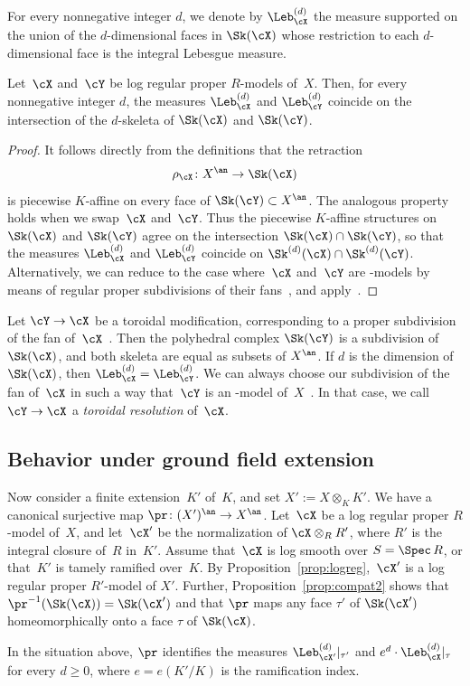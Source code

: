 For every nonnegative integer $d$, we denote by $\Leb^{(d)}_{\cX}$ the measure supported on the union of the $d$-dimensional faces in $\Sk(\cX)$ whose restriction
to each $d$-dimensional face is the integral Lebesgue measure.

\begin{prop}\label{prop:compat3}
Let~$\cX$ and~$\cY$ be log regular proper $R$\nobreakdash-models of~$X$.
Then, for every nonnegative integer $d$, the measures $\Leb^{(d)}_{\cX}$ and $\Leb^{(d)}_{\cY}$ coincide on the intersection of the $d$\nobreakdash-skeleta of $\Sk(\cX)$ and $\Sk(\cY)$.
\end{prop}

\begin{proof}
It follows directly from the definitions that the retraction
\[
\rho_{\cX}\colon X^{\an}\to \Sk(\cX)
\]
is piecewise $K$\nobreakdash-affine
on every face of $\Sk(\cY)\subset X^{\an}$. The analogous property holds when we swap~$\cX$ and~$\cY$. Thus the piecewise $K$\nobreakdash-affine structures on $\Sk(\cX)$ and $\Sk(\cY)$ agree on the intersection $\Sk(\cX)\cap \Sk(\cY)$, so that the measures $\Leb_{\cX}^{(d)}$ and $\Leb_{\cY}^{(d)}$ coincide on $\Sk^{(d)}(\cX)\cap \Sk^{(d)}(\cY)$. Alternatively, we can reduce to the case where~$\cX$ and~$\cY$ are \snc-models by means of regular proper subdivisions of their fans~\cite[10.4]{kato}, and apply~\cite[3.2.4]{MuNi}.
\end{proof}
\begin{example}\label{exam:torres}
Let $\cY\to \cX$ be a toroidal modification, corresponding to a proper subdivision of the fan of~$\cX$~\cite[\S9]{kato}.
Then the polyhedral complex $\Sk(\cY)$ is a subdivision of $\Sk(\cX)$, and both skeleta are equal as subsets of $X^{\an}$.
If $d$ is the dimension of $\Sk(\cX)$, then $\Leb^{(d)}_{\cX}=\Leb^{(d)}_{\cY}$. We can always choose our subdivision of the fan of~$\cX$ in such a way that~$\cY$ is an \snc-model of~$X$~\cite[10.4]{kato}. In that case, we call $\cY\to \cX$ a {\em toroidal resolution} of~$\cX$.
\end{example}
\subsection{Behavior under ground field extension}
Now consider a finite extension~$K'$ of~$K$, and set $X':=X\otimes_KK'$.
We have a canonical surjective map $\pr\colon (X')^{\an}\to X^{\an}$.
Let~$\cX$ be a log regular proper $R$\nobreakdash-model of~$X$, and let~$\cX'$ be the normalization of $\cX\otimes_R R'$, where $R'$ is the integral closure of~$R$ in~$K'$.
Assume that~$\cX$ is log smooth over $S=\Spec\,R$, or that~$K'$ is tamely ramified over~$K$.
By Proposition~\ref{prop:logreg},~$\cX'$ is a log regular proper $R'$-model of $X'$. Further, Proposition~\ref{prop:compat2} shows that $\pr^{-1}(\Sk(\cX))=\Sk(\cX')$
and that $\pr$ maps any face $\tau'$ of $\Sk(\cX')$ homeomorphically onto a face $\tau$ of $\Sk(\cX)$.
\begin{prop}\label{prop:compat4}
In the situation above, $\pr$ identifies the measures $\Leb^{(d)}_{\cX'}|_{\tau'}$
and $e^d\cdot \Leb^{(d)}_{\cX}|_{\tau}$ for every $d\geq 0$,
where $e=e(K'/K)$ is the ramification index.
\end{prop}


